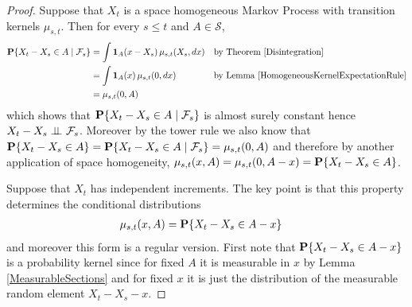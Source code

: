 \begin{proof}
Suppose that $X_t$ is a space homogeneous Markov Process with
transition kernels $\mu_{s,t}$.  Then for every $s\leq t$ and $A \in \mathcal{S}$,
\begin{align*}
\cprobability{\mathcal{F}_s}{X_t - X_s \in A} &= 
\int \characteristic{A}(x - X_s) \, \mu_{s,t}(X_s, dx) & & \text{by
  Theorem \ref{Disintegration}} \\
&=\int \characteristic{A}(x) \, \mu_{s,t}(0, dx) & & \text{by Lemma
  \ref{HomogeneousKernelExpectationRule}} \\
&= \mu_{s,t}(0,A)
\end{align*}
which shows that $\cprobability{\mathcal{F}_s}{X_t - X_s \in A}$ is
almost surely constant hence $\cindependent{X_t -
  X_s}{\mathcal{F}_s}{}$.  Moreover by the tower rule we also know
that $\probability{X_t - X_s \in A}=\cprobability{\mathcal{F}_s}{X_t -
  X_s \in A}=\mu_{s,t}(0,A)$ and therefore by another application of
space homogeneity, $\mu_{s, t}(x, A) = \mu_{s,t}(0, A-x) = \probability{X_t - X_s \in A}$.

Suppose that $X_t$ has independent increments.  The key point is that
this property determines the conditional distributions 
\begin{align*}
\mu_{s,t}(x, A) &= \probability{X_t - X_s \in A - x}
\end{align*}
and moreover this form is a regular version.  First note that $\probability{X_t - X_s \in A - x}$ is a probability
kernel since for fixed $A$ it is measurable in $x$ by Lemma
\ref{MeasurableSections} and for fixed $x$ it is just the distribution
of the measurable random element $X_t - X_s -x$.  


\end{proof}
